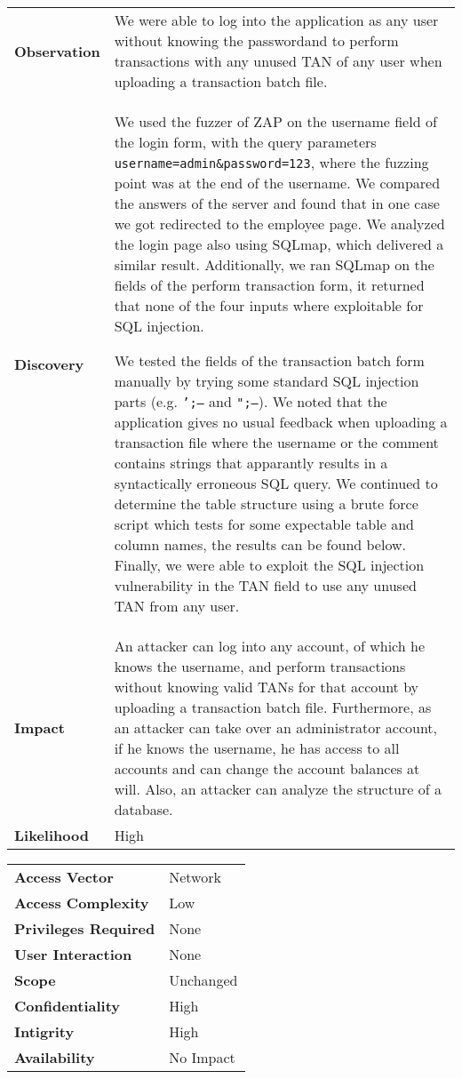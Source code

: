 \begin{tabular}{l|p{10cm}}

\textbf{Observation} & We were able to log into the application as any user without knowing the passwordand to perform transactions with any unused TAN of any user when uploading a transaction batch file. \\
\textbf{Discovery} & We used the fuzzer of ZAP on the username field of the login form, with the query parameters \texttt{username=admin\&password=123}, where the fuzzing point was at the end of the username. We compared the answers of the server and found that in one case we got redirected to the employee page. We analyzed the login page also using SQLmap, which delivered a similar result. Additionally, we ran SQLmap on the fields of the perform transaction form, it returned that none of the four inputs where exploitable for SQL injection.

We tested the fields of the transaction batch form manually by trying some standard SQL injection parts (e.g. \texttt{';--} and \texttt{";--}). We noted that the application gives no usual feedback when uploading a transaction file where the username or the comment contains strings that apparantly results in a syntactically erroneous SQL query. We continued to determine the table structure using a brute force script which tests for some expectable table and column names, the results can be found below. Finally, we were able to exploit the SQL injection vulnerability in the TAN field to use any unused TAN from any user. \\
\textbf{Impact} & An attacker can log into any account, of which he knows the username, and perform transactions without knowing valid TANs for that account by uploading a transaction batch file. Furthermore, as an attacker can take over an administrator account, if he knows the username, he has access to all accounts and can change the account balances at will. Also, an attacker can analyze the structure of a database. \\
\textbf{Likelihood} & High \\
\end{tabular}

\begin{tabular}{l|p{10cm}}
\textbf{Access Vector} & Network \\
\textbf{Access Complexity} & Low \\
\textbf{Privileges Required} & None \\
\textbf{User Interaction} & None \\
\textbf{Scope} & Unchanged \\
\textbf{Confidentiality} & High \\
\textbf{Intigrity} & High \\
\textbf{Availability} & No Impact \\
\end{tabular}


